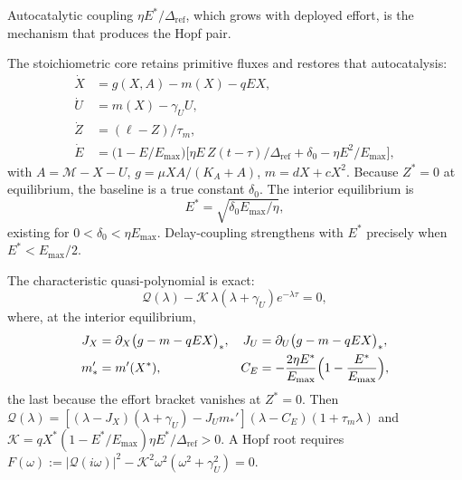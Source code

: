 \documentclass[11pt]{article}
\theoremstyle{definition}
\begin{document}
Autocatalytic coupling $\eta E^*/\Delta_{\mathrm{ref}}$, which grows with deployed effort, is the mechanism that produces the Hopf pair.

The stoichiometric core retains primitive fluxes and restores that autocatalysis:
\begin{equation}
\begin{aligned}
\dot X&=g(X,A)-m(X)-qEX,\\
\dot U&=m(X)-\gamma_U U,\\
\dot Z&=(\ell-Z)/\tau_m,\\
\dot E&=\bigl(1-E/E_{\max}\bigr)\bigl[\eta E\,Z(t-\tau)/\Delta_{\mathrm{ref}}+\delta_0-\eta E^2/E_{\max}\bigr],
\end{aligned}
\label{eq:unified-core-v2}
\end{equation}
with $A=\mathcal M-X-U$, $g=\mu XA/(K_A+A)$, $m=dX+cX^2$. Because $Z^*=0$ at equilibrium, the baseline is a true constant $\delta_0$. The interior equilibrium is
\begin{equation}
E^*=\sqrt{\delta_0 E_{\max}/\eta},
\label{eq:unified-Estar}
\end{equation}
existing for $0<\delta_0<\eta E_{\max}$. Delay-coupling strengthens with $E^*$ precisely when $E^*<E_{\max}/2$.

The characteristic quasi-polynomial is exact:
\begin{equation}
\mathcal Q(\lambda)-\mathcal K\,\lambda(\lambda+\gamma_U)e^{-\lambda\tau}=0,
\label{eq:unified-char-eq}
\end{equation}
where, at the interior equilibrium,
\begin{align*}
J_X&=\partial_X\bigl(g-m-qEX\bigr)_*,&
J_U&=\partial_U\bigl(g-m-qEX\bigr)_*,\\
m_*'&=m'(X^*),&
C_E&=-\frac{2\eta E^*}{E_{\max}}\Bigl(1-\frac{E^*}{E_{\max}}\Bigr),
\end{align*}
the last because the effort bracket vanishes at $Z^*=0$. Then $\mathcal Q(\lambda)=[(\lambda-J_X)(\lambda+\gamma_U)-J_U m_*'](\lambda-C_E)(1+\tau_m\lambda)$ and $\mathcal K=qX^*(1-E^*/E_{\max})\eta E^*/\Delta_{\mathrm{ref}}>0$. A Hopf root requires $F(\omega):=|\mathcal Q(i\omega)|^2-\mathcal K^2\omega^2(\omega^2+\gamma_U^2)=0$.
\end{document}
